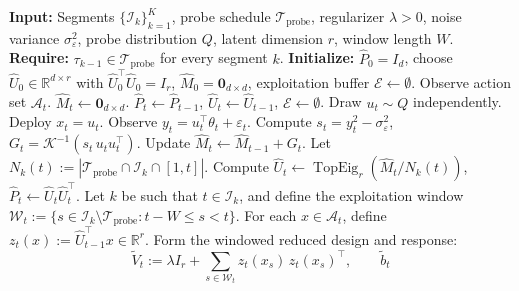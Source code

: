 \documentclass{article}
\newcommand{\R}{\mathbb{R}}
\newcommand{\cA}{\mathcal{A}}
\newcommand{\cI}{\mathcal{I}}
\newcommand{\cTprobe}{\mathcal{T}_{\mathrm{probe}}}
\DeclareMathOperator{\TopEig}{TopEig}
\begin{document}
\begin{algorithm}[t]
  \caption{Single-Play Subspace-Calibrated Optimism with Windowed $r$-Dimensional Exploitation}
  \label{alg:single_play_control_rdim}
  \begin{algorithmic}[1]
  \State \textbf{Input:} Segments $\{\cI_k\}_{k=1}^K$, probe schedule $\cTprobe$,
         regularizer $\lambda > 0$, noise variance $\sigma_\varepsilon^2$,
         probe distribution $Q$, latent dimension $r$, window length $W$.
  \State \textbf{Require:} $\tau_{k-1} \in \cTprobe$ for every segment $k$.
  \State \textbf{Initialize:} $\widehat P_0 = I_d$, choose $\widehat U_0 \in \R^{d\times r}$
         with $\widehat U_0^\top \widehat U_0 = I_r$, $\widehat M_0 = \mathbf{0}_{d\times d}$,
         exploitation buffer $\mathcal{E} \leftarrow \emptyset$.
      \State Observe action set $\cA_t$.
          \State $\widehat M_t \leftarrow \mathbf{0}_{d\times d}$.
          \State $\widehat P_t \leftarrow \widehat P_{t-1}$,\quad
                 $\widehat U_t \leftarrow \widehat U_{t-1}$,\quad
                 $\mathcal{E} \leftarrow \emptyset$.
      \EndIf
      \If{$t \in \cTprobe$}
          \State Draw $u_t \sim Q$ independently.
          \State Deploy $x_t = u_t$.
          \State Observe $y_t = u_t^\top \theta_t + \varepsilon_t$.
          \State Compute
                 $s_t = y_t^2 - \sigma_\varepsilon^2$, \quad
                 $G_t = \mathcal K^{-1}(s_t\, u_t u_t^\top)$.
          \State Update $\widehat M_t \leftarrow \widehat M_{t-1} + G_t$.
          \State Let $N_k(t) := |\cTprobe \cap \cI_k \cap [1,t]|$.
          \State Compute
                 $\widehat U_t \leftarrow \TopEig_r(\widehat M_t / N_k(t))$, \quad
                 $\widehat P_t \leftarrow \widehat U_t \widehat U_t^\top$.
      \Else
          \State Let $k$ be such that $t \in \cI_k$, and define the exploitation window
                 $\mathcal W_t := \{s \in \cI_k \setminus \cTprobe : t-W \le s < t\}$.
          \State For each $x \in \cA_t$, define
                 $z_t(x) := \widehat U_{t-1}^\top x \in \R^r$.
          \State Form the windowed reduced design and response:
          \[
              \widetilde V_t
              :=
              \lambda I_r
              + \sum_{s\in\mathcal W_t}
                z_t(x_s)\, z_t(x_s)^\top,
              \qquad
              \widetilde b_t
\]
\end{algorithmic}
\end{algorithm}
\end{document}
